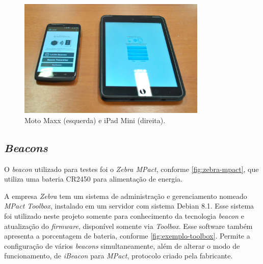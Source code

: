 \begin{figure}[htb]
	\caption{\label{fig:motomaxx-ipad}Moto Maxx (esquerda) e iPad Mini (direita).}
	\begin{center}
		\includegraphics[width=0.8\textwidth]{img/motomaxx-ipad.jpg}
	\end{center}
\end{figure}

\subsection{\textit{Beacons}}\label{sec:beacons-modo}

O \textit{beacon} utilizado para testes foi o \textit{Zebra MPact}, conforme \autoref{fig:zebra-mpact}, que utiliza uma bateria CR2450 para alimentação de energia. 

A empresa \textit{Zebra} tem um sistema de administração e gerenciamento nomeado \textit{MPact Toolbox}, instalado em um servidor com sistema Debian 8.1. Esse sistema foi utilizado neste projeto somente para conhecimento da tecnologia \textit{beacon} e atualização do \textit{firmware}, disponível somente via \textit{Toolbox}. Esse software também apresenta a porcentagem de bateria, conforme \autoref{fig:exemplo-toolbox}. Permite a configuração de vários \textit{beacons} simultaneamente, além de alterar o modo de funcionamento, de \textit{iBeacon} para \textit{MPact}, protocolo criado pela fabricante.

